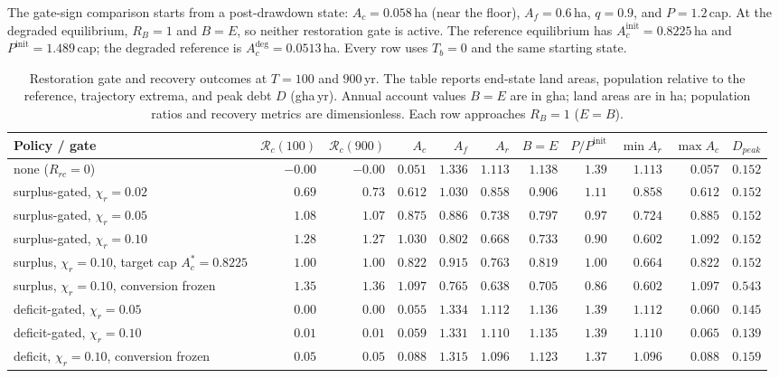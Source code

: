 \documentclass[11pt,a4paper]{article}
\begin{document}
The gate-sign comparison starts from a post-drawdown state: $A_c=0.058$\,ha (near the floor), $A_f=0.6$\,ha, $q=0.9$, and $P=1.2$\,cap. At the degraded equilibrium, $R_B=1$ and $B=E$, so neither restoration gate is active. The reference equilibrium has $A_c^{\mathrm{init}}=0.8225$\,ha and $P^{\mathrm{init}}=1.489$\,cap; the degraded reference is $A_c^{\mathrm{deg}}=0.0513$\,ha. Every row uses $T_b=0$ and the same starting state.

\begin{table}[H]
\centering\scriptsize
\setlength{\tabcolsep}{2pt}
\caption{Restoration gate and recovery outcomes at $T=100$ and $900$\,yr. The table reports end-state land areas, population relative to the reference, trajectory extrema, and peak debt $D$ (gha\,yr). Annual account values $B=E$ are in gha; land areas are in ha; population ratios and recovery metrics are dimensionless. Each row approaches $R_B=1$ ($E=B$).}
\label{tab:si_gates}
\begin{tabular}{l r r r r r r r r r r}
\toprule
Policy / gate & $\mathcal R_c(100)$ & $\mathcal R_c(900)$ & $A_c$ & $A_f$ & $A_r$ & $B=E$ & $P/P^{\mathrm{init}}$ & $\min A_r$ & $\max A_c$ & $D_{peak}$ \\
\midrule
none ($R_{rc}=0$) & $-0.00$ & $-0.00$ & $0.051$ & $1.336$ & $1.113$ & $1.138$ & $1.39$ & $1.113$ & $0.057$ & $0.152$ \\
surplus-gated, $\chi_r=0.02$ & $0.69$ & $0.73$ & $0.612$ & $1.030$ & $0.858$ & $0.906$ & $1.11$ & $0.858$ & $0.612$ & $0.152$ \\
surplus-gated, $\chi_r=0.05$ & $1.08$ & $1.07$ & $0.875$ & $0.886$ & $0.738$ & $0.797$ & $0.97$ & $0.724$ & $0.885$ & $0.152$ \\
surplus-gated, $\chi_r=0.10$ & $1.28$ & $1.27$ & $1.030$ & $0.802$ & $0.668$ & $0.733$ & $0.90$ & $0.602$ & $1.092$ & $0.152$ \\
surplus, $\chi_r=0.10$, target cap $A_c^*=0.8225$ & $1.00$ & $1.00$ & $0.822$ & $0.915$ & $0.763$ & $0.819$ & $1.00$ & $0.664$ & $0.822$ & $0.152$ \\
surplus, $\chi_r=0.10$, conversion frozen & $1.35$ & $1.36$ & $1.097$ & $0.765$ & $0.638$ & $0.705$ & $0.86$ & $0.602$ & $1.097$ & $0.543$ \\
deficit-gated, $\chi_r=0.05$ & $0.00$ & $0.00$ & $0.055$ & $1.334$ & $1.112$ & $1.136$ & $1.39$ & $1.112$ & $0.060$ & $0.145$ \\
deficit-gated, $\chi_r=0.10$ & $0.01$ & $0.01$ & $0.059$ & $1.331$ & $1.110$ & $1.135$ & $1.39$ & $1.110$ & $0.065$ & $0.139$ \\
deficit, $\chi_r=0.10$, conversion frozen & $0.05$ & $0.05$ & $0.088$ & $1.315$ & $1.096$ & $1.123$ & $1.37$ & $1.096$ & $0.088$ & $0.159$ \\
\bottomrule
\end{tabular}
\end{table}
\end{document}
